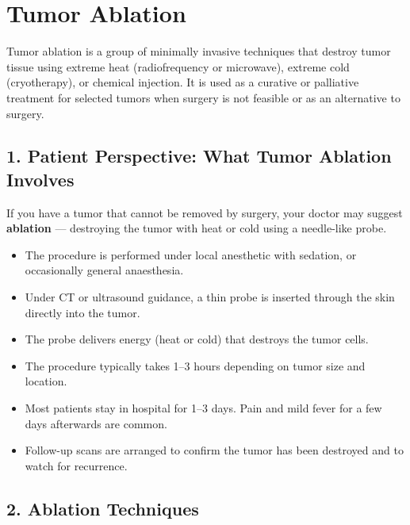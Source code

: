 \chapter{Tumor Ablation}

\label{ch:ch81_tumor_ablation}

Tumor ablation is a group of minimally invasive techniques that destroy tumor tissue using extreme heat (radiofrequency or microwave), extreme cold (cryotherapy), or chemical injection. It is used as a curative or palliative treatment for selected tumors when surgery is not feasible or as an alternative to surgery.


\section{1. Patient Perspective: What Tumor Ablation Involves}

If you have a tumor that cannot be removed by surgery, your doctor may suggest \textbf{ablation} --- destroying the tumor with heat or cold using a needle-like probe.

\begin{itemize}
  \item The procedure is performed under local anesthetic with sedation, or occasionally general anaesthesia.
  \item Under CT or ultrasound guidance, a thin probe is inserted through the skin directly into the tumor.
  \item The probe delivers energy (heat or cold) that destroys the tumor cells.
  \item The procedure typically takes 1--3 hours depending on tumor size and location.
  \item Most patients stay in hospital for 1--3 days. Pain and mild fever for a few days afterwards are common.
  \item Follow-up scans are arranged to confirm the tumor has been destroyed and to watch for recurrence.
\end{itemize}


\section{2. Ablation Techniques}

